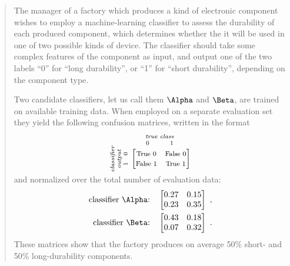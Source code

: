 \documentclass[\ifafour a4paper,12pt,\else a5paper,10pt,\fi%
onecolumn,oneside,article,%
british%
]{memoir}
\theoremstyle{remark}
\theoremstyle{innote}
\renewcommand*{\|}[1][]{\nonscript\:#1\vert\nonscript\:\mathopen{}}
\begin{document}
\begin{quotation}
  \small The manager of a factory which produces a kind of electronic component wishes to employ a machine-learning classifier to assess the durability of each produced component, which determines whether the it will be used in one of two possible kinds of device. The classifier should take some complex features of the component as input, and output one of the two labels \enquote{0} for \enquote{long durability}, or \enquote{1} for \enquote{short durability}, depending on the component type.

Two candidate classifiers, let us call them $\Alpha$ and $\Beta$, are trained on available training data. When employed on a separate evaluation set they yield the following confusion matrices, written in the format
\begin{equation*}
  \rotatebox[origin=c]{90}{
    \clap{\textit{\parbox{5em}{\centering\scriptsize classifier\\output\\$1\quad 0$}}
    }}\ 
    \overbracket[0pt]{
      \begin{bmatrix}
    \text{\footnotesize True 0} & \text{\footnotesize False 0}\\
    \text{\footnotesize False 1} & \text{\footnotesize True 1}\\
      \end{bmatrix}}^{
      \clap{\textit{\parbox{6em}{\centering\scriptsize true class\\$0\hspace{3em}1$}}
    }}
\end{equation*}
and normalized over the total number of evaluation data:
\begin{align}
  \label{eq:CM_A}
\text{classifier $\Alpha$:}\quad  \begin{bmatrix}
    0.27 & 0.15 \\ 0.23 & 0.35
  \end{bmatrix}
\ ,
  \\
  \label{eq:CM_B}
\text{classifier $\Beta$:}\quad  \begin{bmatrix}
    0.43 & 0.18 \\ 0.07 & 0.32
  \end{bmatrix}
\ .
\end{align}
These matrices show that the factory produces on average 50\% short- and 50\% long-durability components.


\end{quotation}
\end{document}
